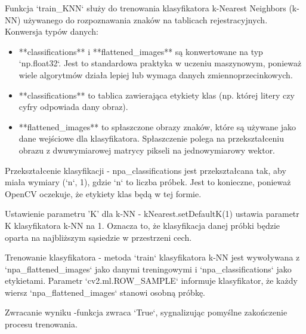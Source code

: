 \documentclass[12pt,a4paper,oneside]{article}
\theoremstyle{definition}
\numberwithin{equation}{section}
\begin{document}
Funkcja `train\_KNN` służy do trenowania klasyfikatora k-Nearest Neighbors (k-NN) używanego do rozpoznawania znaków na tablicach rejestracyjnych. 
Konwersja typów danych:
\begin{itemize}
  \item **classifications** i **flattened\_images** są konwertowane na typ `np.float32`. Jest to standardowa praktyka w uczeniu maszynowym, ponieważ wiele algorytmów działa lepiej lub wymaga danych zmiennoprzecinkowych.
  \item **classifications** to tablica zawierająca etykiety klas (np. której litery czy cyfry odpowiada dany obraz).
  \item **flattened\_images** to spłaszczone obrazy znaków, które są używane jako dane wejściowe dla klasyfikatora. Spłaszczenie polega na przekształceniu obrazu z dwuwymiarowej matrycy pikseli na jednowymiarowy wektor.
\end{itemize}





Przekształcenie klasyfikacji - npa\_classifications jest przekształcana tak, aby miała wymiary (`n`, 1), gdzie `n` to liczba próbek. Jest to konieczne, ponieważ OpenCV oczekuje, że etykiety klas będą w tej formie.

Ustawienie parametru 'K' dla k-NN - kNearest.setDefaultK(1) ustawia parametr K klasyfikatora k-NN na 1. Oznacza to, że klasyfikacja danej próbki będzie oparta na najbliższym sąsiedzie w przestrzeni cech.

Trenowanie klasyfikatora - metoda `train` klasyfikatora k-NN jest wywoływana z `npa\_flattened\_images` jako danymi treningowymi i `npa\_classifications` jako etykietami. Parametr `cv2.ml.ROW\_SAMPLE` informuje klasyfikator, że każdy wiersz `npa\_flattened\_images` stanowi osobną próbkę.


Zwracanie wyniku -funkcja zwraca `True`, sygnalizując pomyślne zakończenie procesu trenowania.
\end{document}
